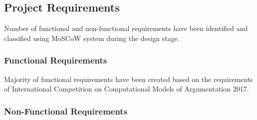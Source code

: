 \subsection{Project Requirements} \label{label:projectRequirements}
Number of functional and non-functional requirements have been identified and classified using MoSCoW system during the design stage. 

\subsubsection{Functional Requirements}
Majority of functional requirements have been created based on the requirements of International Competition on Computational Models of Argumentation 2017. 

\subsubsection{Non-Functional Requirements}